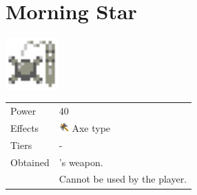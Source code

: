 \section{Morning Star}
\label{weapon:morning_star}

\includegraphics[height=2cm,keepaspectratio]{./resources/weapons/morningstar}

\begin{longtable}{ l p{9cm} }
	Power
	& 40
\\ %
	Effects
	& \includegraphics[height=1em,keepaspectratio]{./resources/effects/axe}
	Axe type
\\ %
	Tiers
	& -
\\ %
	Obtained
	& \nameref{char:reuben}’s weapon. \\
	& Cannot be used by the player.
\end{longtable}
